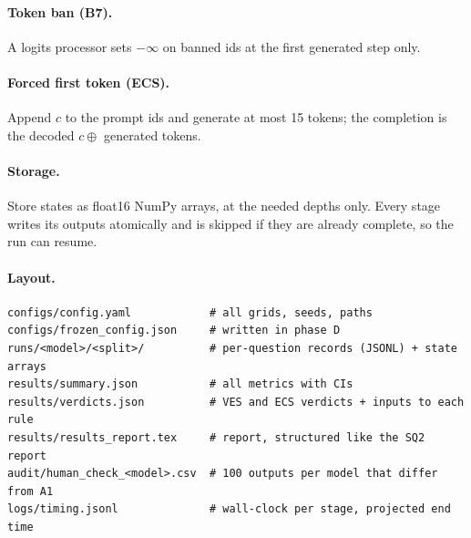 \documentclass[11pt]{article}
\begin{document}
\paragraph{Token ban (B7).} A logits processor sets $-\infty$ on banned ids at the first generated step only.

\paragraph{Forced first token (ECS).} Append $c$ to the prompt ids and generate at most 15 tokens; the completion
is the decoded $c \oplus$ generated tokens.

\paragraph{Storage.} Store states as float16 NumPy arrays, at the needed depths only. Every stage writes its
outputs atomically and is skipped if they are already complete, so the run can resume.

\paragraph{Layout.}
\begin{verbatim}
configs/config.yaml            # all grids, seeds, paths
configs/frozen_config.json     # written in phase D
runs/<model>/<split>/          # per-question records (JSONL) + state arrays
results/summary.json           # all metrics with CIs
results/verdicts.json          # VES and ECS verdicts + inputs to each rule
results/results_report.tex     # report, structured like the SQ2 report
audit/human_check_<model>.csv  # 100 outputs per model that differ from A1
logs/timing.jsonl              # wall-clock per stage, projected end time
\end{verbatim}

\end{document}
